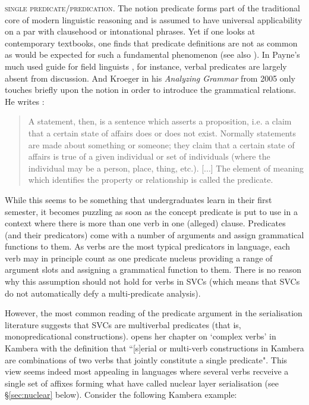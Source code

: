 \textsc{single predicate/predication}. The notion predicate forms part of the traditional core of modern linguistic reasoning and is assumed to have universal applicability on a par with clausehood or intonational phrases. Yet if one looks at contemporary textbooks, one finds that predicate definitions are not as common as would be expected for such a fundamental phenomenon (see also \citealt{baker2010complex}). In Payne's much used guide for field linguists \parencite{payne1997describing}, for instance, verbal predicates are largely absent from discussion. And Kroeger in his \textit{Analyzing Grammar} from 2005 only touches briefly upon the notion in order to introduce the grammatical relations. He writes \citep[53]{kroeger2005analyzing}:
\begin{quote}A statement, then, is a sentence which asserts a proposition, i.e. a claim that a certain state of affairs does or does not exist. Normally statements are made about something or someone; they claim that a certain state of affairs is true of a given individual or set of individuals (where the individual may
be a person, place, thing, etc.). [...] The element of meaning which identifies the property or relationship is called the predicate.\end{quote}
While this seems to be something that undergraduates learn in their first semester, it becomes puzzling as soon as the concept predicate is put to use in a context where there is more than one verb in one (alleged) clause. Predicates (and their predicators) come with a number of arguments and assign grammatical functions to them. As verbs are the most typical predicators in language, each verb may in principle count as one predicate nucleus providing a range of argument slots and assigning a grammatical function to them. There is no reason why this assumption should not hold for verbs in SVCs (which means that SVCs do not automatically defy a multi-predicate analysis).

However, the most common reading of the predicate argument in the serialisation literature suggests that SVCs are multiverbal predicates (that is, monopredicational constructions). \citet{klamer1998grammar} opens her chapter on `complex verbs' in Kambera with the definition that ``[s]erial or multi-verb constructions in Kambera are combinations of two verbs that jointly constitute a single predicate". This view seems indeed most appealing in languages where several verbs recveive a single set of affixes forming what \citet{foley1984functional} have called nuclear layer serialisation (see §\ref{sec:nuclear} below). Consider the following Kambera example:

